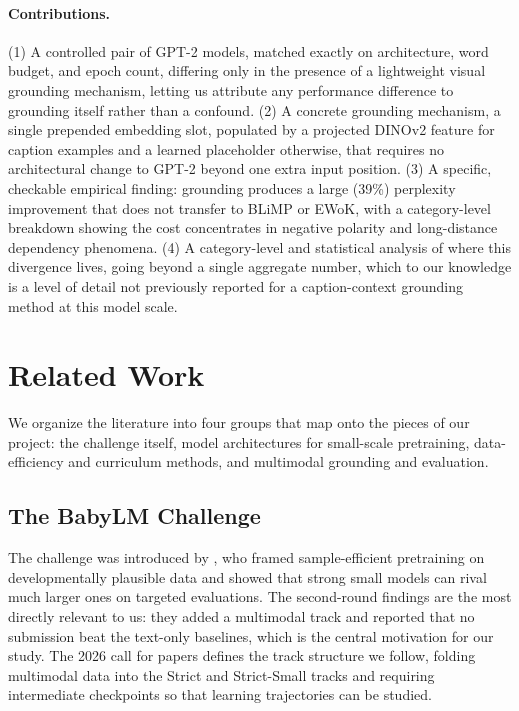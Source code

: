 \documentclass[11pt]{article}
\begin{document}
\paragraph{Contributions.} (1) A controlled pair of GPT-2 models, matched exactly on architecture, word budget, and epoch count, differing only in the presence of a lightweight visual grounding mechanism, letting us attribute any performance difference to grounding itself rather than a confound. (2) A concrete grounding mechanism, a single prepended embedding slot, populated by a projected DINOv2 feature for caption examples and a learned placeholder otherwise, that requires no architectural change to GPT-2 beyond one extra input position. (3) A specific, checkable empirical finding: grounding produces a large (39\%) perplexity improvement that does not transfer to BLiMP or EWoK, with a category-level breakdown showing the cost concentrates in negative polarity and long-distance dependency phenomena. (4) A category-level and statistical analysis of where this divergence lives, going beyond a single aggregate number, which to our knowledge is a level of detail not previously reported for a caption-context grounding method at this model scale.

\section{Related Work}
\label{sec:related}
We organize the literature into four groups that map onto the pieces of our project: the challenge itself, model architectures for small-scale pretraining, data-efficiency and curriculum methods, and multimodal grounding and evaluation.

\subsection{The BabyLM Challenge}
The challenge was introduced by \citet{warstadt2023findings}, who framed sample-efficient pretraining on developmentally plausible data and showed that strong small models can rival much larger ones on targeted evaluations. The second-round findings \citep{choshen2024findings} are the most directly relevant to us: they added a multimodal track and reported that no submission beat the text-only baselines, which is the central motivation for our study. The 2026 call for papers \citep{babylm2026cfp} defines the track structure we follow, folding multimodal data into the Strict and Strict-Small tracks and requiring intermediate checkpoints so that learning trajectories can be studied.
\end{document}
